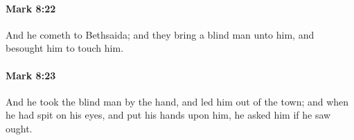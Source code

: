 		\paragraph{Mark 8:22} %
			\label{MARK-8-22}

			And he cometh to Bethsaida; and they bring a blind man unto him, and besought him to touch him.

			\begin{framed}
			\scriptsize
				\begin{compactdesc}
					\item[SBLG] 
				\end{compactdesc}
			\end{framed}

		\paragraph{Mark 8:23} %
			\label{MARK-8-23}

			And he took the blind man by the hand, and led him out of the town; and when he had spit on his eyes, and put his hands upon him, he asked him if he saw ought.

